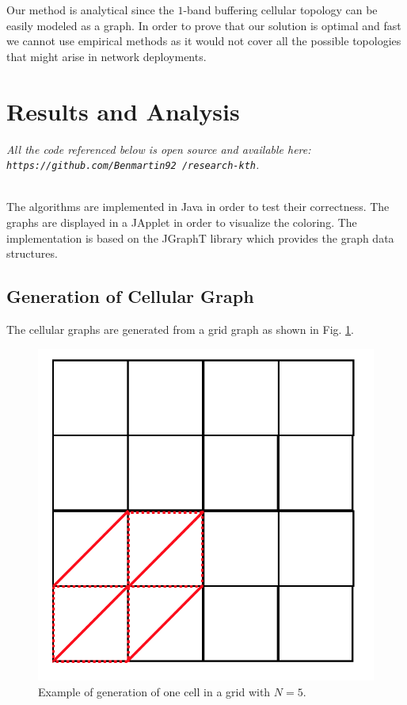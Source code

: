 \documentclass[letterpaper, 10 pt, conference]{ieeeconf}  %
\begin{document}
Our method is analytical since the $1$-band buffering cellular topology can be easily modeled as a graph. In order to prove that our solution is optimal and fast we cannot use empirical methods as it would not cover all the possible topologies that might arise in network deployments.

\section{Results and Analysis}\label{sec:results-analysis}

\textit{All the code referenced below is open source and available here: \texttt{https://github.com/Benmartin92 /research-kth}. \\\\}

The algorithms are implemented in Java in order to test their correctness. The graphs are displayed in a JApplet in order to visualize the coloring. The implementation is based on the JGraphT \cite{JGraphT} library which provides the graph data structures.

\subsection{Generation of Cellular Graph}
The cellular graphs are generated from a grid graph as shown in Fig. \ref{cellgraphgeneration}.

\begin{figure}[!h]
\centering
\includegraphics[scale=0.4]{cellGeneration.png}
\caption{Example of generation of one cell in a grid with $N=5$.}
\label{cellgraphgeneration}
\end{figure}
\end{document}
